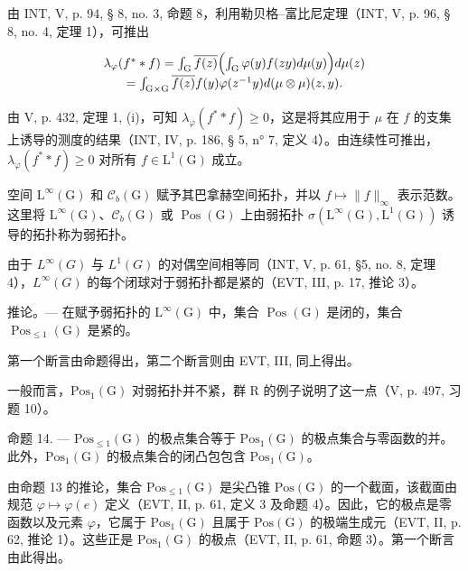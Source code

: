 由 INT, V, p. 94, § 8, no. 3, 命题 8，利用勒贝格–富比尼定理（INT, V, p. 96, § 8, no. 4, 定理 1），可推出

\[
\begin{array}{c} \lambda_ {\varphi} (f ^ {*} * f) = \int_ {\mathrm{G}} \overline {{f (z)}} \Bigl (\int_ {\mathrm{G}} \varphi (y) f (z y) d \mu (y) \Bigr) d \mu (z) \\ = \int_ {\mathrm{G} \times \mathrm{G}} \overline {{f (z)}} f (y) \varphi (z ^ {- 1} y) d (\mu \otimes \mu) (z, y). \end{array}
\]

由 V, p. 432, 定理 1, (i)，可知 \(\lambda_{\varphi}(f^{*} * f) \geqslant 0\)，这是将其应用于 \(\mu\) 在 \(f\) 的支集上诱导的测度的结果（INT, IV, p. 186, § 5, n° 7, 定义 4）。由连续性可推出，\(\lambda_{\varphi}(f^{*} * f) \geqslant 0\) 对所有 \(f \in \mathrm{L}^1(\mathrm{G})\) 成立。

空间 \(\mathrm{L}^{\infty}(\mathrm{G})\) 和 \(\mathcal{C}_{b}(\mathrm{G})\) 赋予其巴拿赫空间拓扑，并以 \(f \mapsto \|f\|_{\infty}\) 表示范数。这里将 \(\mathrm{L}^{\infty}(\mathrm{G})\)、\(\mathcal{C}_{b}(\mathrm{G})\) 或 \(\operatorname{Pos}(\mathrm{G})\) 上由弱拓扑 \(\sigma(\mathrm{L}^{\infty}(\mathrm{G}), \mathrm{L}^{1}(\mathrm{G}))\) 诱导的拓扑称为弱拓扑。

由于 \(L^{\infty}(G)\) 与 \(L^{1}(G)\) 的对偶空间相等同（INT, V, p. 61, §5, no. 8, 定理 4），\(L^{\infty}(G)\) 的每个闭球对于弱拓扑都是紧的（EVT, III, p. 17, 推论 3）。

推论。--- 在赋予弱拓扑的 \(\mathrm{L}^{\infty}(\mathrm{G})\) 中，集合 \(\operatorname{Pos}(\mathrm{G})\) 是闭的，集合 \(\operatorname{Pos}_{\leqslant 1}(\mathrm{G})\) 是紧的。

第一个断言由命题得出，第二个断言则由 EVT, III, 同上得出。

一般而言，\(\mathrm{Pos}_{1}(\mathrm{G})\) 对弱拓扑并不紧，群 R 的例子说明了这一点（V, p. 497, 习题 10）。

命题 14. --- \(\mathrm{Pos}_{\leqslant 1}(\mathrm{G})\) 的极点集合等于 \(\mathrm{Pos}_1(\mathrm{G})\) 的极点集合与零函数的并。此外，\(\mathrm{Pos}_1(\mathrm{G})\) 的极点集合的闭凸包包含 \(\mathrm{Pos}_1(\mathrm{G})\)。

由命题 13 的推论，集合 \(\mathrm{Pos}_{\leqslant 1}(\mathrm{G})\) 是尖凸锥 \(\mathrm{Pos}(\mathrm{G})\) 的一个截面，该截面由规范 \(\varphi \mapsto \varphi(e)\) 定义（EVT, II, p. 61, 定义 3 及命题 4）。因此，它的极点是零函数以及元素 \(\varphi\)，它属于 \(\mathrm{Pos}_1(\mathrm{G})\) 且属于 \(\mathrm{Pos}(\mathrm{G})\) 的极端生成元（EVT, II, p. 62, 推论 1）。这些正是 \(\mathrm{Pos}_1(\mathrm{G})\) 的极点（EVT, II, p. 61, 命题 3）。第一个断言由此得出。

